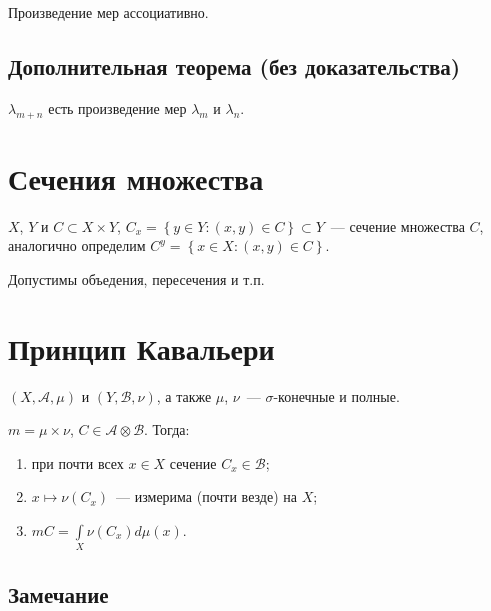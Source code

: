 \documentclass{article}
\begin{document}
            Произведение мер ассоциативно.
    
        \subsection{Дополнительная теорема (без доказательства)}
    
            $\lambda_{m + n}$ есть произведение мер $\lambda_m$ и $\lambda_n$.
        
    \newpage
    
    \section{Сечения множества}
    
        $X$, $Y$ и $C \subset X \times Y$, $C_x = \left\{ y \in Y : (x, y) \in C \right\} \subset Y$~--- сечение множества $C$, аналогично определим $C^y = \left\{ x \in X : (x, y) \in C \right\}$.
    
        Допустимы объедения, пересечения и т.п.
    
    \newpage

    \section{Принцип Кавальери}
    
        $(X, \mathcal{A}, \mu)$ и $(Y, \mathcal{B}, \nu)$, а также $\mu$, $\nu$~--- $\sigma$-конечные и полные. 
        
        $m = \mu \times \nu$, $C \in \mathcal{A} \otimes \mathcal{B}$. Тогда:
        
        \begin{enumerate}
        
            \item при почти всех $x \in X$ сечение $C_x \in \mathcal{B}$;
            
            \item $x \mapsto \nu (C_x)$~--- измерима (почти везде) на $X$;
            
            \item $m C = \int\limits_{X} \nu (C_x) d \mu(x)$.
            
        \end{enumerate}
        
        \subsection{Замечание}
        
\end{document}
